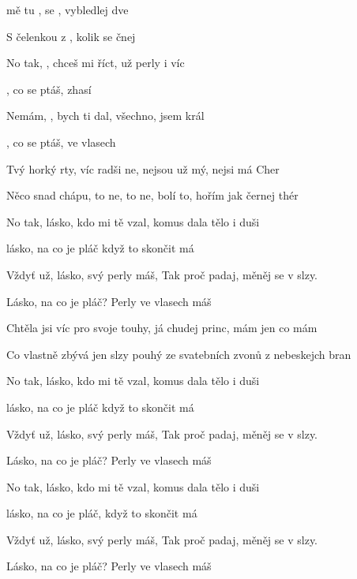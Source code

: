 

\zs
{} mě tu ,  se ,
vybledlej   dve

S čelenkou z   ,
kolik se  čnej 
\ks

\zr
No tak, ,  chceš mi říct,
 už perly  i víc

,  co se ptáš,  zhasí

Nemám, ,  bych ti dal,
 všechno,  jsem král

,  co se ptáš,  ve vlasech 
\kr

\zs
Tvý horký rty, víc radši ne,
nejsou už mý, nejsi má Cher

Něco snad chápu, to ne, to ne,
bolí to, hořím jak černej thér
\ks

\zs
No tak, lásko, kdo mi tě vzal,
komus dala tělo i duši

lásko, na co je pláč
když to skončit má
\ks

\zs
Vždyť už, lásko, svý perly máš,
Tak proč padaj, měněj se v slzy.

Lásko, na co je pláč?
Perly ve vlasech máš
\ks

\zr  \kr

\zs
Chtěla jsi víc pro svoje touhy,
já chudej princ, mám jen co mám

Co vlastně zbývá jen slzy pouhý
ze svatebních zvonů z nebeskejch bran
\ks

\zs
No tak, lásko, kdo mi tě vzal,
komus dala tělo i duši

lásko, na co je pláč
když to skončit má
\ks

\zs
Vždyť už, lásko, svý perly máš,
Tak proč padaj, měněj se v slzy.

Lásko, na co je pláč?
Perly ve vlasech máš
\ks

\zr  \kr

\zr
No tak, lásko, kdo mi tě vzal,
komus dala tělo i duši

lásko, na co je pláč,
když to skončit má
\kr

\zs
Vždyť už, lásko, svý perly máš,
Tak proč padaj, měněj se v slzy.

Lásko, na co je pláč?
Perly ve vlasech máš
\ks

\kp





